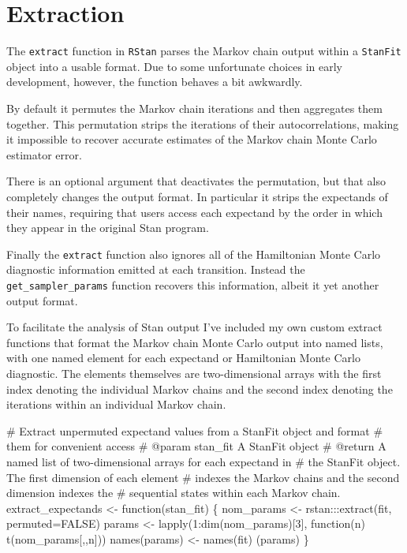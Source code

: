 \documentclass[
  letterpaper,
  DIV=11,
  numbers=noendperiod]{scrartcl}
\newenvironment{Shaded}{\begin{snugshade}}{\end{snugshade}}
\newcommand{\AttributeTok}[1]{\textcolor[rgb]{0.40,0.45,0.13}{#1}}
\newcommand{\CommentTok}[1]{\textcolor[rgb]{0.37,0.37,0.37}{#1}}
\newcommand{\ConstantTok}[1]{\textcolor[rgb]{0.56,0.35,0.01}{#1}}
\newcommand{\ControlFlowTok}[1]{\textcolor[rgb]{0.00,0.23,0.31}{#1}}
\newcommand{\DecValTok}[1]{\textcolor[rgb]{0.68,0.00,0.00}{#1}}
\newcommand{\FunctionTok}[1]{\textcolor[rgb]{0.28,0.35,0.67}{#1}}
\newcommand{\NormalTok}[1]{\textcolor[rgb]{0.00,0.23,0.31}{#1}}
\newcommand{\OtherTok}[1]{\textcolor[rgb]{0.00,0.23,0.31}{#1}}
\newcommand{\SpecialCharTok}[1]{\textcolor[rgb]{0.37,0.37,0.37}{#1}}
\begin{document}
\hypertarget{extraction}{%
\section{Extraction}\label{extraction}}

The \texttt{extract} function in \texttt{RStan} parses the Markov chain
output within a \texttt{StanFit} object into a usable format. Due to
some unfortunate choices in early development, however, the function
behaves a bit awkwardly.

By default it permutes the Markov chain iterations and then aggregates
them together. This permutation strips the iterations of their
autocorrelations, making it impossible to recover accurate estimates of
the Markov chain Monte Carlo estimator error.

There is an optional argument that deactivates the permutation, but that
also completely changes the output format. In particular it strips the
expectands of their names, requiring that users access each expectand by
the order in which they appear in the original Stan program.

Finally the \texttt{extract} function also ignores all of the
Hamiltonian Monte Carlo diagnostic information emitted at each
transition. Instead the \texttt{get\_sampler\_params} function recovers
this information, albeit it yet another output format.

To facilitate the analysis of Stan output I've included my own custom
extract functions that format the Markov chain Monte Carlo output into
named lists, with one named element for each expectand or Hamiltonian
Monte Carlo diagnostic. The elements themselves are two-dimensional
arrays with the first index denoting the individual Markov chains and
the second index denoting the iterations within an individual Markov
chain.

\begin{Shaded}
\begin{Highlighting}[]
\CommentTok{\# Extract unpermuted expectand values from a StanFit object and format }
\CommentTok{\# them for convenient access}
\CommentTok{\# @param stan\_fit A StanFit object}
\CommentTok{\# @return A named list of two{-}dimensional arrays for each expectand in }
\CommentTok{\#         the StanFit object.  The first dimension of each element }
\CommentTok{\#         indexes the Markov chains and the second dimension indexes the }
\CommentTok{\#         sequential states within each Markov chain. }
\NormalTok{extract\_expectands }\OtherTok{\textless{}{-}} \ControlFlowTok{function}\NormalTok{(stan\_fit) \{}
\NormalTok{  nom\_params }\OtherTok{\textless{}{-}}\NormalTok{ rstan}\SpecialCharTok{:::}\FunctionTok{extract}\NormalTok{(fit, }\AttributeTok{permuted=}\ConstantTok{FALSE}\NormalTok{)}
\NormalTok{  params }\OtherTok{\textless{}{-}} \FunctionTok{lapply}\NormalTok{(}\DecValTok{1}\SpecialCharTok{:}\FunctionTok{dim}\NormalTok{(nom\_params)[}\DecValTok{3}\NormalTok{], }\ControlFlowTok{function}\NormalTok{(n) }\FunctionTok{t}\NormalTok{(nom\_params[,,n]))}
  \FunctionTok{names}\NormalTok{(params) }\OtherTok{\textless{}{-}} \FunctionTok{names}\NormalTok{(fit)}
\NormalTok{  (params)}
\NormalTok{\}}
\end{Highlighting}
\end{Shaded}
\end{document}
